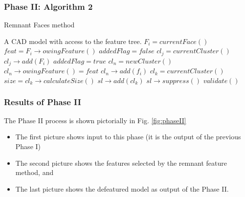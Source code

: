 \subsubsection{Phase II: Algorithm 2}

\begin{algorithm}[!tbh]
	\caption{Remnant Faces method}
	\label{alg2}
	\begin{algorithmic}
		\REQUIRE A CAD model with access to the feature tree. 
			\STATE $F_i = currentFace()$
			\STATE $feat = F_i \rightarrow owingFeature()$
			\STATE $addedFlag = false$
				\STATE $cl_j = currentCluster()$
					\STATE  $cl_j \rightarrow add(F_i)$
					\STATE $addedFlag = true$
				\ENDIF
			\ENDWHILE
				\STATE  $cl_n = newCluster()$
				\STATE  $cl_n \rightarrow owingFeature() = feat$
				\STATE  $cl_n \rightarrow add(f_i)$
			\ENDIF
		\ENDWHILE
			\STATE $cl_k = currentCluster()$
			\STATE $size = cl_k \rightarrow calculateSize()$
				\STATE   $sl \rightarrow add(cl_k)$
			\ENDIF			
		\ENDWHILE
		\STATE  $sl \rightarrow suppress()$
		\STATE  $validate()$
	\end{algorithmic}
\end{algorithm}

\bigskip
\subsubsection{Results of Phase II}

The Phase II process is shown pictorially in Fig. \ref{fig:phaseII}

\begin{itemize}
[noitemsep,topsep=2pt,parsep=2pt,partopsep=2pt]
\item The first picture shows input to this phase (it is the output of the previous Phase I)
\item The second picture shows the features selected by the remnant feature method, and 
\item The last picture shows the defeatured model as output of the Phase II.
\end{itemize}

